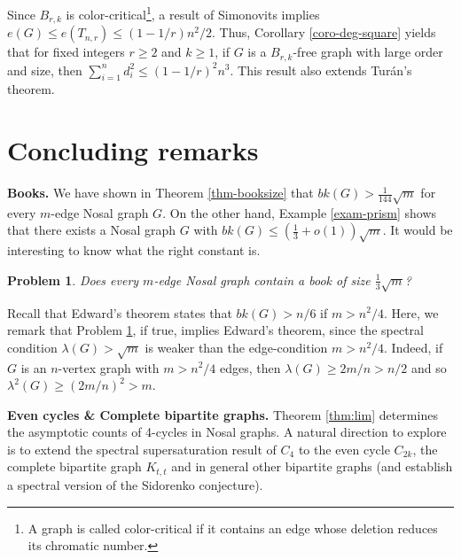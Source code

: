 \documentclass[11pt,a4paper]{article}
\newtheorem{problem}[theorem]{Problem}
\theoremstyle{definition}
\theoremstyle{remark}
\begin{document}
Since $B_{r,k}$ is color-critical\footnote{A graph is called color-critical
if it contains an edge whose deletion reduces its chromatic number.}, a result of Simonovits implies 
$e(G) \le e(T_{n,r}) \le \left( 1- {1}/{r}\right) {n^2}/{2}$. 
Thus, Corollary \ref{coro-deg-square} yields that 
for fixed integers $r\ge 2$ and $k\ge 1$, 
if $G$ is a $B_{r,k}$-free graph with large order and size, 
then  
$ \sum_{i=1}^n d_i^2 \le \left( 1- {1}/{r}\right)^2n^3$. 
This result also extends Tur\'{a}n's theorem. 






\section{Concluding remarks}

\label{sec-6}


\noindent\textbf{Books.} We have shown in Theorem \ref{thm-booksize}  that 
$  bk(G)>  \frac{1}{144}\sqrt{m}$ for every $m$-edge Nosal graph $G$. 
On the other hand, Example \ref{exam-prism} shows that there exists a Nosal graph 
$G$ with $bk(G) \le (\frac{1}{3}+o(1))\sqrt{m}$. 
It would be interesting to know what the right constant is.

\begin{problem} \label{conj-bk-13}
Does every $m$-edge Nosal graph contain a book of size $\frac{1}{3}\sqrt{m}$?
\end{problem} 

Recall that 
Edward's theorem states that $bk(G) > n/6$ if $m > n^2/4$. 
Here, we remark that Problem \ref{conj-bk-13}, if true, implies Edward's theorem, since the spectral condition $\lambda (G) > \sqrt{m}$ is weaker than the edge-condition $m > n^2/4$. 
Indeed, if $G$ is an $n$-vertex graph  with $m > n^2/4$ edges, then $\lambda (G)\ge 2m/n > n/2$ and so $\lambda^2 (G) \ge (2m/n)^2 > m$. 

\medskip

\noindent\textbf{Even cycles \&  Complete bipartite graphs.} 
Theorem \ref{thm:lim} determines the asymptotic counts of 4-cycles in Nosal graphs.   
A natural direction to explore is to extend the spectral supersaturation result of $C_4$ to the even cycle $C_{2k}$, the complete bipartite graph $K_{t,t}$ and in general other bipartite graphs (and establish a spectral version of the Sidorenko conjecture). 

\end{document}
